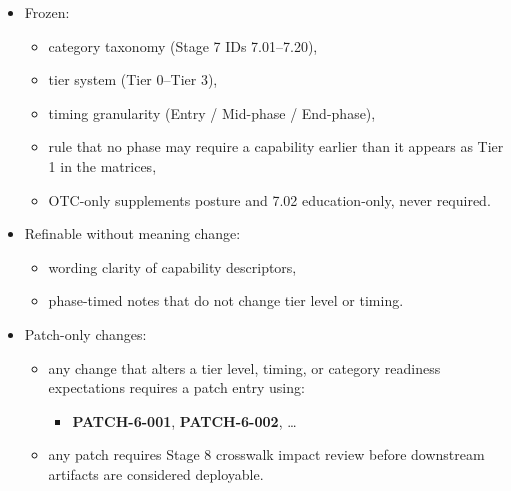 \documentclass[10pt]{article}
\begin{document}
\begin{itemize}
\item Frozen:
  \begin{itemize}
  \item category taxonomy (Stage 7 IDs 7.01–7.20),
  \item tier system (Tier 0–Tier 3),
  \item timing granularity (Entry / Mid-phase / End-phase),
  \item rule that no phase may require a capability earlier than it appears as Tier 1 in the matrices,
  \item OTC-only supplements posture and 7.02 education-only, never required.
  \end{itemize}
\item Refinable without meaning change:
  \begin{itemize}
  \item wording clarity of capability descriptors,
  \item phase-timed notes that do not change tier level or timing.
  \end{itemize}
\item Patch-only changes:
  \begin{itemize}
  \item any change that alters a tier level, timing, or category readiness expectations requires a patch entry using:
    \begin{itemize}
    \item \textbf{PATCH-6-001}, \textbf{PATCH-6-002}, …
    \end{itemize}
  \item any patch requires Stage 8 crosswalk impact review before downstream artifacts are considered deployable.
  \end{itemize}
\end{itemize}
\end{document}
